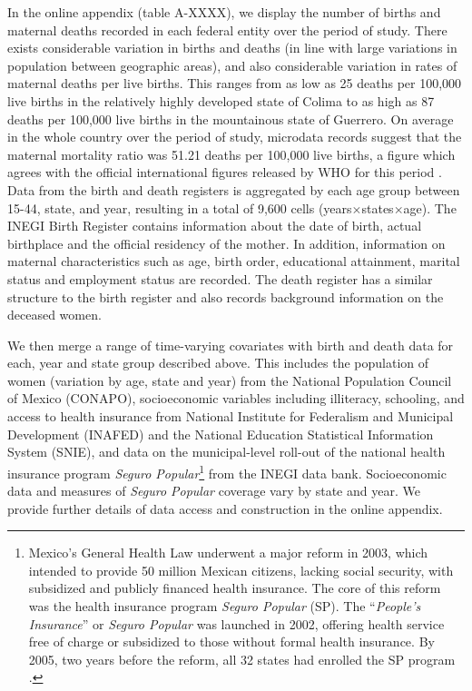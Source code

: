 \documentclass[a4paper, 11pt]{article}
\begin{document}
\begin{spacing}{2}
In the online appendix (table A-XXXX), we display the number of births and maternal deaths recorded in each federal entity over the period of study.  There exists considerable variation in births and deaths (in line with large variations in population between geographic areas), and also considerable variation in rates of maternal deaths per live births.  This ranges from as low as 25 deaths per 100,000 live births in the relatively highly developed state of Colima to as high as 87 deaths per 100,000 live births in the mountainous state of Guerrero.  On average in the whole country over the period of study, microdata records suggest that the maternal mortality ratio was 51.21 deaths per 100,000 live births, a figure which agrees with the official international figures released by WHO for this period \citep{WHO2015}.   Data from the birth and death registers is aggregated by each age group between 15-44, state, and year, resulting in a total of 9,600 cells (years$\times$states$\times$age). The INEGI Birth Register contains information about the date of birth, actual birthplace and the official residency of the mother. In addition, information on maternal characteristics such as age, birth order, educational attainment, marital status and employment status are recorded. The death register has a similar structure to the birth register and also records background information on the deceased women.

We then merge a range of time-varying covariates with birth and death data for each, year and state group described above.  This includes the population of women (variation by age, state and year) from the National Population Council of Mexico (CONAPO), socioeconomic variables including illiteracy, schooling, and access to health insurance from National Institute for Federalism and Municipal Development (INAFED) and the National Education Statistical Information System (SNIE), and data on the municipal-level roll-out of the national health insurance program \emph{Seguro Popular}\footnote{Mexico's General Health Law underwent a major reform in 2003, which intended to provide 50 million Mexican citizens, lacking social security, with subsidized and publicly financed health insurance. The core of this reform was the health insurance program \textit{Seguro Popular} (SP). The ``\textit{People’s Insurance}'' or \textit{Seguro Popular} was launched in 2002, offering health service free of charge or subsidized to those without formal health insurance. By 2005, two years before the reform, all 32 states had enrolled the SP program \citep{Knauletal2007}.} from the INEGI data bank.  Socioeconomic data and measures of \emph{Seguro Popular} coverage vary by state and year.  We provide further details of data access and construction in the online appendix.


\end{spacing}
\end{document}
